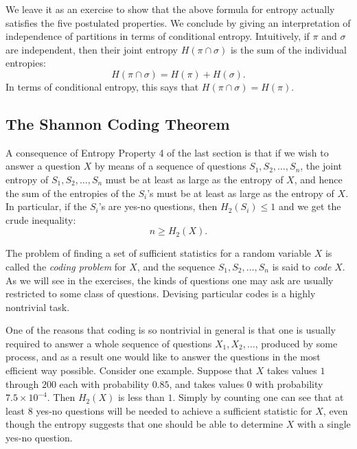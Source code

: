 \documentclass{report}
\begin{document}
We leave it as an exercise to show that the above formula for entropy actually satisfies the five postulated properties. We conclude by giving an interpretation of independence of partitions in terms of conditional entropy. Intuitively, if \( \pi \) and \( \sigma \) are independent, then their joint entropy \( H(\pi \cap \sigma) \) is the sum of the individual entropies:
\[
H(\pi \cap \sigma) = H(\pi) + H(\sigma).
\]
In terms of conditional entropy, this says that \( H(\pi \cap \sigma) = H(\pi) \).

\subsection*{The Shannon Coding Theorem}

A consequence of Entropy Property 4 of the last section is that if we wish to answer a question \( X \) by means of a sequence of questions \( S_1, S_2, \ldots, S_n \), the joint entropy of \( S_1, S_2, \ldots, S_n \) must be at least as large as the entropy of \( X \), and hence the sum of the entropies of the \( S_i \)'s must be at least as large as the entropy of \( X \). In particular, if the \( S_i \)'s are yes-no questions, then \( H_2(S_i) \leq 1 \) and we get the crude inequality:
\[
n \geq H_2(X).
\]

The problem of finding a set of sufficient statistics for a random variable \( X \) is called the \emph{coding problem} for \( X \), and the sequence \( S_1, S_2, \ldots, S_n \) is said to \emph{code} \( X \). As we will see in the exercises, the kinds of questions one may ask are usually restricted to some class of questions. Devising particular codes is a highly nontrivial task.

One of the reasons that coding is so nontrivial in general is that one is usually required to answer a whole sequence of questions \( X_1, X_2, \ldots \), produced by some process, and as a result one would like to answer the questions in the most efficient way possible. Consider one example. Suppose that \( X \) takes values \( 1 \) through \( 200 \) each with probability \( 0.85 \), and takes values \( 0 \) with probability \( 7.5 \times 10^{-4} \). Then \( H_2(X) \) is less than \( 1 \). Simply by counting one can see that at least \( 8 \) yes-no questions will be needed to achieve a sufficient statistic for \( X \), even though the entropy suggests that one should be able to determine \( X \) with a single yes-no question.
\end{document}
